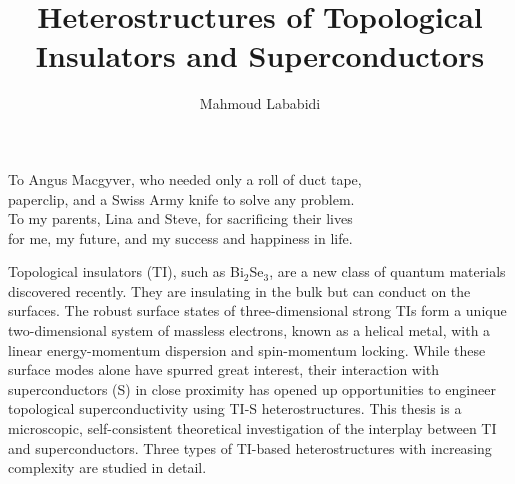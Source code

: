 \documentclass[11pt,letterpaper]{report}
\begin{document}
\title{Heterostructures of Topological Insulators and Superconductors}
\author{Mahmoud Lababidi}






\signaturepage

\titlepage
\copyrightpage

\dedicationpage
\noindent \begin{center} To Angus Macgyver, who needed only a roll of duct tape,\\ paperclip, and a Swiss Army knife to solve any problem. \\
To my parents, Lina and Steve, for sacrificing their lives\\ for me, my future, and my success and happiness in life.%
\end{center}






\tableofcontents


\listoffigures



\abstractpage
Topological insulators (TI), such as Bi$_2$Se$_3$, 
are a new class of quantum materials discovered recently. They are insulating in the bulk but
can conduct on the surfaces. The robust surface states of three-dimensional strong TIs form a unique two-dimensional system of massless electrons, known as a helical metal, with a linear energy-momentum dispersion and spin-momentum locking. While these surface modes alone have spurred great interest, their interaction with superconductors (S) in close proximity has opened up opportunities to engineer topological superconductivity using TI-S heterostructures. This thesis is a microscopic, self-consistent theoretical investigation of the interplay between TI and superconductors. Three types of TI-based heterostructures with increasing complexity are studied in detail. 
\end{document}
